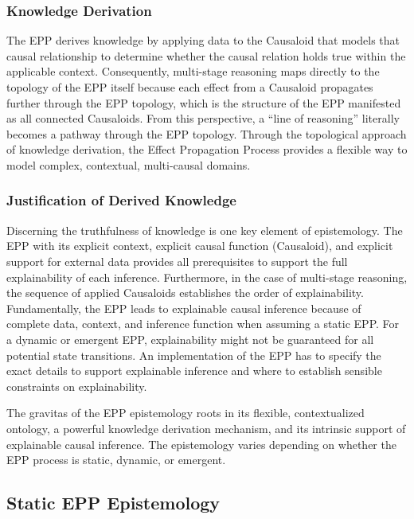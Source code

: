 \subsubsection{Knowledge Derivation}

The EPP derives knowledge by applying data to the Causaloid that models that causal relationship to determine whether the causal relation holds true within the applicable context. Consequently, multi-stage reasoning maps directly to the topology of the EPP itself because each effect from a Causaloid propagates further through the EPP topology, which is the structure of the EPP manifested as all connected Causaloids.
From this perspective, a “line of reasoning” literally becomes a pathway through the EPP topology. Through the topological approach of knowledge derivation, the Effect Propagation Process provides a flexible way to model complex, contextual, multi-causal domains.

\subsubsection{Justification of Derived Knowledge}

Discerning the truthfulness of knowledge is one key element of epistemology. The EPP with its explicit context, explicit causal function (Causaloid), and explicit support for external data provides all prerequisites to support the full explainability of each inference. Furthermore, in the case of multi-stage reasoning, the sequence of applied Causaloids establishes the order of explainability.
Fundamentally, the EPP leads to explainable causal inference because of complete data, context, and inference function when assuming a static EPP. For a dynamic or emergent EPP, explainability might not be guaranteed for all potential state transitions. An implementation of the EPP has to specify the exact details to support explainable inference and where to establish sensible constraints on explainability.

The gravitas of the EPP epistemology roots in its flexible, contextualized ontology, a powerful knowledge derivation mechanism, and its intrinsic support of explainable causal inference. The epistemology varies depending on whether the EPP process is static, dynamic, or emergent.

\newpage

\subsection{Static EPP Epistemology}

